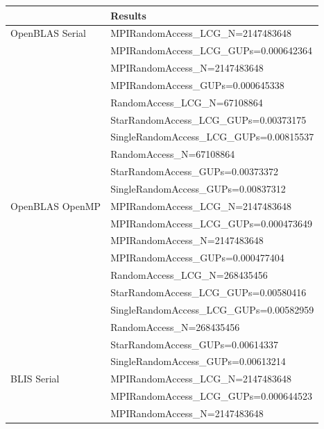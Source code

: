 \documentclass{report}
\begin{document}
\begin{table}[H]
\begin{center}
\begin{tabular}{ |l|l| } 
\hline
                & Results \\ 
\hline
OpenBLAS Serial & MPIRandomAccess\_LCG\_N=2147483648 \\
                & MPIRandomAccess\_LCG\_GUPs=0.000642364 \\
                \cline{2-2} 
                & MPIRandomAccess\_N=2147483648 \\
                & MPIRandomAccess\_GUPs=0.000645338 \\
                \cline{2-2} 
                & RandomAccess\_LCG\_N=67108864 \\
                & StarRandomAccess\_LCG\_GUPs=0.00373175 \\
                & SingleRandomAccess\_LCG\_GUPs=0.00815537 \\
                \cline{2-2} 
                & RandomAccess\_N=67108864 \\
                & StarRandomAccess\_GUPs=0.00373372 \\
                & SingleRandomAccess\_GUPs=0.00837312 \\ 
\hline
OpenBLAS OpenMP & MPIRandomAccess\_LCG\_N=2147483648 \\
                & MPIRandomAccess\_LCG\_GUPs=0.000473649 \\
                \cline{2-2} 
                & MPIRandomAccess\_N=2147483648 \\
                & MPIRandomAccess\_GUPs=0.000477404 \\
                \cline{2-2} 
                & RandomAccess\_LCG\_N=268435456 \\
                & StarRandomAccess\_LCG\_GUPs=0.00580416 \\
                & SingleRandomAccess\_LCG\_GUPs=0.00582959 \\
                \cline{2-2} 
                & RandomAccess\_N=268435456 \\
                & StarRandomAccess\_GUPs=0.00614337 \\
                & SingleRandomAccess\_GUPs=0.00613214 \\
\hline
BLIS Serial     & MPIRandomAccess\_LCG\_N=2147483648 \\
                & MPIRandomAccess\_LCG\_GUPs=0.000644523 \\
                \cline{2-2} 
                & MPIRandomAccess\_N=2147483648 \\

\end{tabular}
\end{center}
\end{table}
\end{document}
